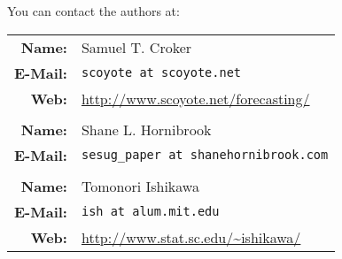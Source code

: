 \documentclass[10pt]{sugconf-ish}
\begin{document}
You can contact the authors at:

\begin{tabular}[t]{rl}
\textbf{Name:} & Samuel T. Croker \\
\textbf{E-Mail:} & \texttt{scoyote at scoyote.net} \\
\textbf{Web:} & \url{http://www.scoyote.net/forecasting/} \\
 & \\
\textbf{Name:} & Shane L. Hornibrook \\
\textbf{E-Mail:} & \texttt{sesug\_paper at shanehornibrook.com} \\
 & \\
\textbf{Name:} & Tomonori Ishikawa \\
\textbf{E-Mail:} & \texttt{ish at alum.mit.edu} \\
\textbf{Web:} & \url{http://www.stat.sc.edu/~ishikawa/} \\
\end{tabular}


\vfill
\SASisRegisteredTrademark\ \OtherTrademarks
\end{document}
